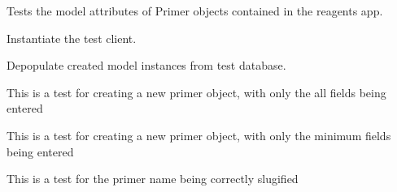 \documentclass[letterpaper,10pt,english]{sphinxmanual}
\begin{document}

\begin{fulllineitems}
\label{api:experimentdb.reagents.tests.PrimerModelTests}
Tests the model attributes of Primer objects contained in the reagents app.

\begin{fulllineitems}
\label{api:experimentdb.reagents.tests.PrimerModelTests.setUp}
Instantiate the test client.

\end{fulllineitems}


\begin{fulllineitems}
\label{api:experimentdb.reagents.tests.PrimerModelTests.tearDown}
Depopulate created model instances from test database.

\end{fulllineitems}


\begin{fulllineitems}
\label{api:experimentdb.reagents.tests.PrimerModelTests.test_create_primer_all_fields}
This is a test for creating a new primer object, with only the all fields being entered

\end{fulllineitems}


\begin{fulllineitems}
\label{api:experimentdb.reagents.tests.PrimerModelTests.test_create_primer_minimal}
This is a test for creating a new primer object, with only the minimum fields being entered

\end{fulllineitems}


\begin{fulllineitems}
\label{api:experimentdb.reagents.tests.PrimerModelTests.test_primer_slugify}
This is a test for the primer name being correctly slugified

\end{fulllineitems}


\end{fulllineitems}
\end{document}
